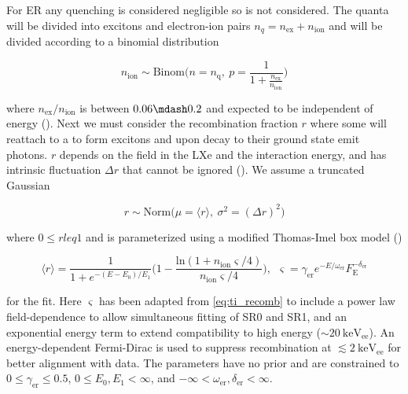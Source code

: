 For ER any quenching is considered negligible so is not considered.  The quanta will be divided into excitons and electron-ion pairs
$n_q = n_{\mathrm{ex}} + n_{\mathrm{ion}}$ and will be divided according to a binomial distribution

\begin{equation}
n_{\mathrm{ion}} \sim \mathrm{Binom} \Bigg(n = n_{\mathrm{q}},\ p = \frac{1}{1 + \frac{n_{\mathrm{ex}}}{n_{\mathrm{ion}}}} \Bigg)
\label{eq:er_nr_calibrations_parameter_determ_er_nions}
\end{equation}

\noindent where $n_{\mathrm{ex}} / n_{\mathrm{ion}}$ is between $0.06 \mdash 0.2$ and expected to be independent of energy
().  Next we must consider the recombination fraction $r$ where some \electron will reattach to a  to form
excitons and upon decay to their ground state emit photons.  $r$ depends on the field in the LXe and the interaction energy, and has
intrinsic fluctuation $\Delta r$ that cannot be ignored ().  We assume a truncated Gaussian

\begin{equation}
r \sim \mathrm{Norm} \Big( \mu = \langle r \rangle,\ \sigma^2 = (\Delta r)^2 \Big)
\end{equation}

\noindent where $0 \leq r leq 1$ and is parameterized using a modified Thomas-Imel box model ()

\begin{equation}
\langle r \rangle = \frac{1}{1 + e^{-(E - E_0) / E_1}}
\bigg( 1 - \frac{\mathrm{ln}(1 + n_{\mathrm{ion}} \varsigma / 4)}{n_{\mathrm{ion}} \varsigma / 4} \bigg)
,\ \ \varsigma = \gamma_{\mathrm{er}} e^{-E / \omega_{\mathrm{er}}} F_{\mathrm{E}}^{-\delta_{\mathrm{er}}}
\label{eq:er_nr_calibrations_parameter_determ_ti}
\end{equation}

\noindent for the fit.  Here $\varsigma$ has been adapted from \eqref{eq:ti_recomb} to include a power law field-dependence to allow
simultaneous fitting of SR0 and SR1, and an exponential energy term to extend compatibility to high energy
(${\sim} 20\ \mathrm{keV_{ee}}$).  An energy-dependent Fermi-Dirac is used to suppress recombination at
$\lesssim 2\ \mathrm{keV_{ee}}$ for better alignment with data.  The parameters have no prior and are constrained to
$0 \leq \gamma_{\mathrm{er}} \leq 0.5$, $0 \leq E_0, E_1 < \infty$, and
$-\infty < \omega_{\mathrm{er}}, \delta_{\mathrm{er}} < \infty$.

